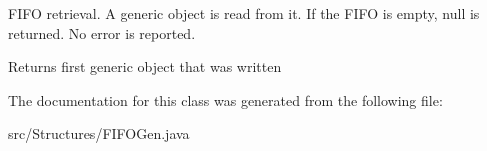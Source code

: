 F\+I\+FO retrieval. A generic object is read from it. If the F\+I\+FO is empty, {\ttfamily null} is returned. No error is reported.

\begin{DoxyReturn}{Returns}
first generic object that was written 
\end{DoxyReturn}


The documentation for this class was generated from the following file\+:\begin{DoxyCompactItemize}
\item 
src/\+Structures/F\+I\+F\+O\+Gen.\+java\end{DoxyCompactItemize}
